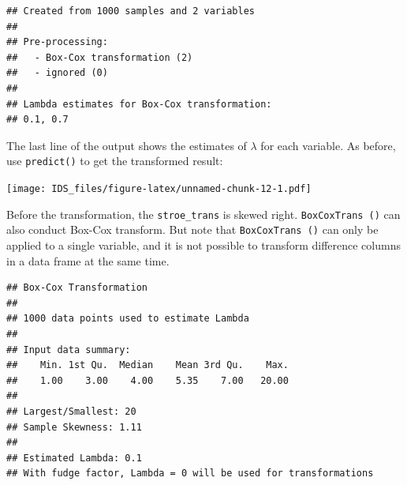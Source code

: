 \documentclass[12pt,]{krantz}
\makeatletter
\newenvironment{Shaded}{\begin{snugshade}}{\end{snugshade}}
\newcommand{\DataTypeTok}[1]{\textcolor[rgb]{0.27,0.27,0.27}{#1}}
\newcommand{\DecValTok}[1]{\textcolor[rgb]{0.06,0.06,0.06}{#1}}
\newcommand{\KeywordTok}[1]{\textcolor[rgb]{0.27,0.27,0.27}{\textbf{#1}}}
\newcommand{\NormalTok}[1]{#1}
\newcommand{\OperatorTok}[1]{\textcolor[rgb]{0.43,0.43,0.43}{\textbf{#1}}}
\newcommand{\StringTok}[1]{\textcolor[rgb]{0.5,0.5,0.5}{#1}}
\newenvironment{kframe}{%
\medskip{}
\setlength{\fboxsep}{.8em}
 \def\at@end@of@kframe{}%
 \ifinner\ifhmode%
  \def\at@end@of@kframe{\end{minipage}}%
  \begin{minipage}{\columnwidth}%
 \fi\fi%
 \def\FrameCommand##1{\hskip\@totalleftmargin \hskip-\fboxsep
 \colorbox{shadecolor}{##1}\hskip-\fboxsep
     \hskip-\linewidth \hskip-\@totalleftmargin \hskip\columnwidth}%
 \MakeFramed {\advance\hsize-\width
   \@totalleftmargin\z@ \linewidth\hsize
   \@setminipage}}%
 {\par\unskip\endMakeFramed%
 \at@end@of@kframe}
\renewenvironment{Shaded}{\begin{kframe}}{\end{kframe}}
\makeatother
\begin{document}
\begin{verbatim}
## Created from 1000 samples and 2 variables
## 
## Pre-processing:
##   - Box-Cox transformation (2)
##   - ignored (0)
## 
## Lambda estimates for Box-Cox transformation:
## 0.1, 0.7
\end{verbatim}

The last line of the output shows the estimates of \(\lambda\) for each variable. As before, use \texttt{predict()} to get the transformed result:

\begin{Shaded}
\end{Shaded}

\texttt{[image: IDS\_files/figure-latex/unnamed-chunk-12-1.pdf]}

Before the transformation, the \texttt{stroe\_trans} is skewed right.
\texttt{BoxCoxTrans\ ()} can also conduct Box-Cox transform. But note that \texttt{BoxCoxTrans\ ()} can only be applied to a single variable, and it is not possible to transform difference columns in a data frame at the same time.

\begin{Shaded}
\end{Shaded}

\begin{verbatim}
## Box-Cox Transformation
## 
## 1000 data points used to estimate Lambda
## 
## Input data summary:
##    Min. 1st Qu.  Median    Mean 3rd Qu.    Max. 
##    1.00    3.00    4.00    5.35    7.00   20.00 
## 
## Largest/Smallest: 20 
## Sample Skewness: 1.11 
## 
## Estimated Lambda: 0.1 
## With fudge factor, Lambda = 0 will be used for transformations
\end{verbatim}
\end{document}

